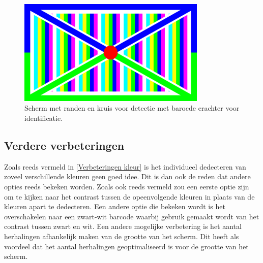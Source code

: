 \begin{figure}[h!]
	\center
	\includegraphics[width=0.8\textwidth]{img/screen.png}
	\caption{Scherm met randen en kruis voor detectie met barocde erachter voor identificatie.}
	\label{scherm}
\end{figure}

\subsection{Verdere verbeteringen}
Zoals reeds vermeld in \ref{Verbeteringen kleur} is het individueel dedecteren van zoveel verschillende kleuren geen goed idee. Dit is dan ook de reden dat andere opties reeds bekeken worden. Zoals ook reeds vermeld zou een eerste optie zijn om te kijken naar het contrast tussen de opeenvolgende kleuren in plaats van de kleuren apart te dedecteren. Een andere optie die bekeken wordt is het overschakelen naar een zwart-wit barcode waarbij gebruik gemaakt wordt van het contrast tussen zwart en wit. Een andere mogelijke verbetering is het aantal herhalingen afhankelijk maken van de grootte van het scherm. Dit heeft als voordeel dat het aantal herhalingen geoptimaliseerd is voor de grootte van het scherm.
